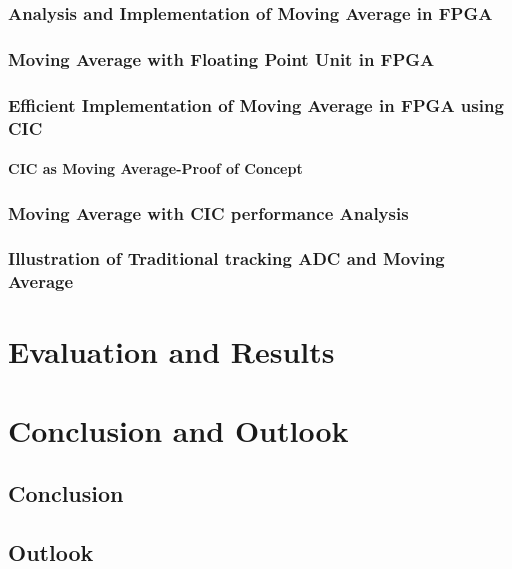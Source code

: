 \documentclass[linedtoc,
               parskip,
               twoside,
               longdoc,
               11pt,
               noheadingspace,
               accentcolor=tud1d,
               bigchapter,
               colorback]{tudreport}
\begin{document}
\subsection{ Analysis and Implementation of Moving Average in FPGA}
\subsection{ Moving Average with Floating Point Unit in FPGA}
\subsection{ Efficient Implementation of Moving Average in FPGA using CIC}
\subsubsection{CIC as Moving Average-Proof of Concept}
\subsection{ Moving Average with CIC performance Analysis}
\subsection{Illustration of Traditional tracking ADC and Moving Average}

\chapter{Evaluation and Results}

\chapter{Conclusion and Outlook}
\section{Conclusion}
\section{Outlook}



\clearpage

\end{document}
